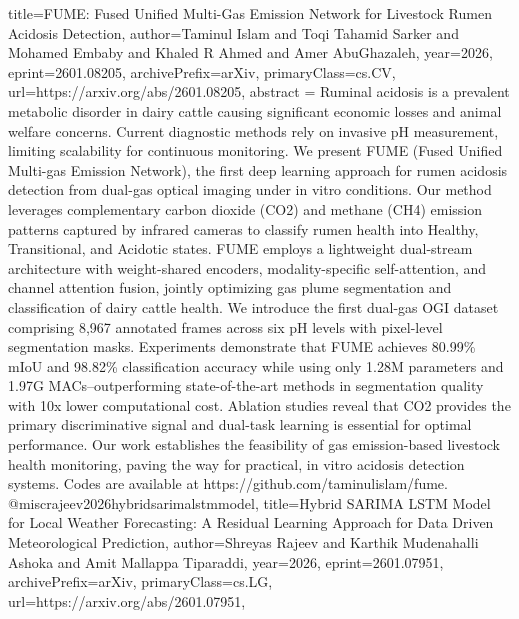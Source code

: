 {      title={FUME: Fused Unified Multi-Gas Emission Network for Livestock Rumen Acidosis Detection}, 
      author={Taminul Islam and Toqi Tahamid Sarker and Mohamed Embaby and Khaled R Ahmed and Amer AbuGhazaleh},
      year={2026},
      eprint={2601.08205},
      archivePrefix={arXiv},
      primaryClass={cs.CV},
      url={https://arxiv.org/abs/2601.08205},
      abstract = {Ruminal acidosis is a prevalent metabolic disorder in dairy cattle causing significant economic losses and animal welfare concerns. Current diagnostic methods rely on invasive pH measurement, limiting scalability for continuous monitoring. We present FUME (Fused Unified Multi-gas Emission Network), the first deep learning approach for rumen acidosis detection from dual-gas optical imaging under in vitro conditions. Our method leverages complementary carbon dioxide (CO2) and methane (CH4) emission patterns captured by infrared cameras to classify rumen health into Healthy, Transitional, and Acidotic states. FUME employs a lightweight dual-stream architecture with weight-shared encoders, modality-specific self-attention, and channel attention fusion, jointly optimizing gas plume segmentation and classification of dairy cattle health. We introduce the first dual-gas OGI dataset comprising 8,967 annotated frames across six pH levels with pixel-level segmentation masks. Experiments demonstrate that FUME achieves 80.99\% mIoU and 98.82\% classification accuracy while using only 1.28M parameters and 1.97G MACs--outperforming state-of-the-art methods in segmentation quality with 10x lower computational cost. Ablation studies reveal that CO2 provides the primary discriminative signal and dual-task learning is essential for optimal performance. Our work establishes the feasibility of gas emission-based livestock health monitoring, paving the way for practical, in vitro acidosis detection systems. Codes are available at https://github.com/taminulislam/fume.}
}@misc{rajeev2026hybridsarimalstmmodel,
      title={Hybrid SARIMA LSTM Model for Local Weather Forecasting: A Residual Learning Approach for Data Driven Meteorological Prediction}, 
      author={Shreyas Rajeev and Karthik Mudenahalli Ashoka and Amit Mallappa Tiparaddi},
      year={2026},
      eprint={2601.07951},
      archivePrefix={arXiv},
      primaryClass={cs.LG},
      url={https://arxiv.org/abs/2601.07951},
}
